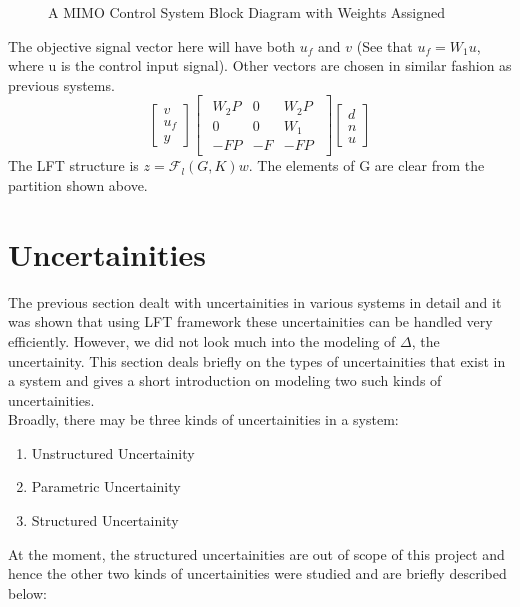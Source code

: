 \documentclass[a4paper,12pt]{article}
\begin{document}
				\begin{figure}[H]
 
			  \centering
			  
			  
			  \caption{A MIMO Control System Block Diagram with Weights Assigned}
			 \label{example2}
		\end{figure}		 The objective signal vector here will have both $u_{f}$ and $v$ (See that $u_{f}=W_{1}u$, where u is the control input signal). Other vectors are chosen in similar fashion as previous systems. 
				\[
				\begin{bmatrix}
					v \\ u_{f} \\ \hline y
				\end{bmatrix}
				\begin{bmatrix}
					\begin{array}{cc|c}
						W_{2}P & 0 & W_{2}P \\
						0 & 0 & W_{1} \\ \hline
						-FP & -F & -FP
					\end{array}
				\end{bmatrix}
				\begin{bmatrix}
					d\\n\\ \hline u
				\end{bmatrix}
				\]
				The LFT structure is $z=\mathscr{F}_{l}(G,K)w$. The elements of G are clear from the partition shown above.
		\section{Uncertainities}The previous section dealt with uncertainities in various systems in detail and it was shown that using LFT framework these uncertainities can be handled very efficiently. However, we did not look much into the modeling of $\Delta$, the uncertainity. This section deals briefly on the types of uncertainities that exist in a system and gives a short introduction on modeling two such kinds of uncertainities. \\
		Broadly, there may be three kinds of uncertainities in a system:
		\begin{enumerate}
			\item Unstructured Uncertainity
			\item Parametric Uncertainity
			\item Structured Uncertainity
		\end{enumerate}
		At the moment, the structured uncertainities are out of scope of this project and hence the other two kinds of uncertainities were studied and are briefly described below: 
\end{document}
